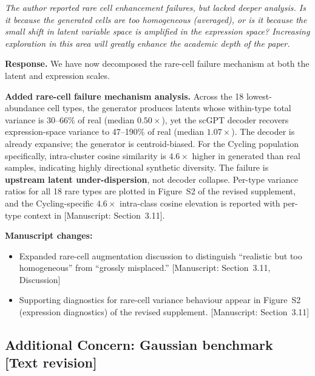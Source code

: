 \documentclass[11pt,letterpaper]{article}
\newcommand{\statustext}{\textcolor{statusblue}{\textbf{[Text revision]}}}
\newcommand{\msref}[1]{\textcolor{blue!60!black}{\textsf{[Manuscript: #1]}}}
\begin{document}
\begin{reviewercomment}
\itshape
The author reported rare cell enhancement failures, but lacked deeper analysis. Is it because the generated cells are too homogeneous (averaged), or is it because the small shift in latent variable space is amplified in the expression space? Increasing exploration in this area will greatly enhance the academic depth of the paper.
\end{reviewercomment}

\noindent\textbf{Response.}
We have now decomposed the rare-cell failure mechanism at both the latent and expression scales.

\begin{revisionupdate}
\textbf{Added rare-cell failure mechanism analysis.}
Across the 18 lowest-abundance cell types, the generator produces latents whose within-type total variance is 30--66\% of real (median $0.50\times$), yet the scGPT decoder recovers expression-space variance to 47--190\% of real (median $1.07\times$). The decoder is already expansive; the generator is centroid-biased. For the Cycling population specifically, intra-cluster cosine similarity is $4.6\times$ higher in generated than real samples, indicating highly directional synthetic diversity. The failure is \textbf{upstream latent under-dispersion}, not decoder collapse. Per-type variance ratios for all 18 rare types are plotted in Figure~S2 of the revised supplement, and the Cycling-specific $4.6\times$ intra-class cosine elevation is reported with per-type context in \msref{Section~3.11}.
\end{revisionupdate}

\noindent\textbf{Manuscript changes:}
\begin{itemize}
  \item Expanded rare-cell augmentation discussion to distinguish ``realistic but too homogeneous'' from ``grossly misplaced.'' \msref{Section~3.11, Discussion}
  \item Supporting diagnostics for rare-cell variance behaviour appear in Figure~S2 (expression diagnostics) of the revised supplement. \msref{Section~3.11}
\end{itemize}

\medskip

\subsection*{Additional Concern: Gaussian benchmark \hfill \statustext}
\end{document}

